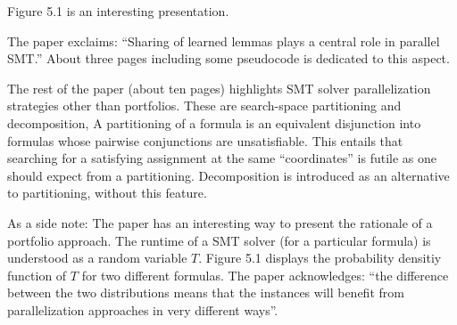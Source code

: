 \documentclass{scrartcl}
\begin{document}
Figure 5.1 is an interesting presentation.

The paper exclaims:
\enquote{Sharing of learned lemmas plays a central role in parallel SMT.}
About three pages including some pseudocode is dedicated to this aspect.

The rest of the paper (about ten pages) highlights SMT solver parallelization strategies
other than portfolios.
These are search-space partitioning and decomposition,
A partitioning of a formula is an equivalent disjunction into formulas
whose pairwise conjunctions are unsatisfiable.
This entails that searching for a satisfying assignment at the same \enquote{coordinates}
is futile as one should expect from a partitioning.
Decomposition is introduced as an alternative to partitioning,
without this feature.

As a side note: The paper has an interesting way to present the rationale of a portfolio approach.
The runtime of a SMT solver (for a particular formula) is understood as a random variable \(T\).
Figure 5.1 displays the probability densitiy function of \(T\) for two different formulas.
The paper acknowledges:
\enquote{the difference between the two distributions means that the instances will benefit
from parallelization approaches in very different ways}.
\end{document}
